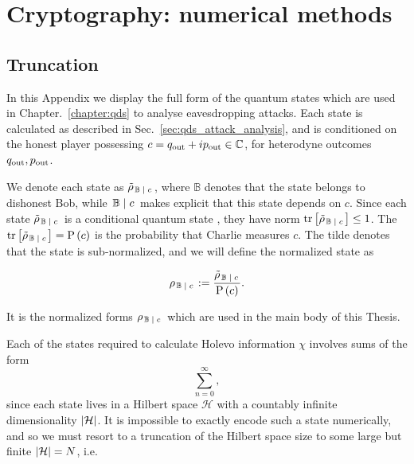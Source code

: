\chapter{Cryptography: numerical methods}\label{appendix:crypto_numerical_methods}

\section{Truncation}
In this Appendix we display the full form of the quantum states which are used in Chapter.~\ref{chapter:qds} to analyse eavesdropping attacks. Each state is calculated as described in Sec.~\ref{sec:qds_attack_analysis}, and is conditioned on the honest player possessing $c = q_{\text{out}} + i p_{\text{out}} \in \mathbb{C}$, for heterodyne outcomes $q_{\text{out}}, p_{\text{out}}$.

We denote each state as $\tilde{\rho}_{\left. \mathbb{B} \; \middle| \; c\right.}$, where $\mathbb{B}$ denotes that the state belongs to dishonest Bob, while $\left. \mathbb{B} \; \middle| \; c \right.$ makes explicit that this state depends on $c$. Since each state $\tilde{\rho}_{\left. \mathbb{B} \; \middle| \; c\right.}$ is a conditional quantum state \cite{Nielsen2010}, they have norm $\tr\left[\tilde{\rho}_{\left. \mathbb{B} \; \middle| \; c\right.}\right]\le 1$. The $\tr\left[\tilde{\rho}_{\left. \mathbb{B} \; \middle| \; c\right.}\right] = \text{P}\left(c\right)$ is the probability that Charlie measures $c$. The tilde denotes that the state is sub-normalized, and we will define the normalized state as

\begin{equation}
\rho_{\left. \mathbb{B} \; \middle| \; c \right.} := \frac{\tilde{\rho}_{\left. \mathbb{B} \; \middle| \; c\right.}}{\text{P}\left(c\right)}.
\end{equation}

\noindent It is the normalized forms $\rho_{\left. \mathbb{B} \; \middle| \; c \right.}$ which are used in the main body of this Thesis.

Each of the states required to calculate Holevo information $\chi$ involves sums of the form
\begin{equation}
\sum_{n = 0}^\infty ,
\end{equation}
since each state lives in a Hilbert space $\mathcal{H}$ with a countably infinite dimensionality $\left|\mathcal{H}\right|$. It is impossible to exactly encode such a state numerically, and so we must resort to a truncation of the Hilbert space size to some large but finite $\left|\mathcal{H}\right| = N$, i.e.

